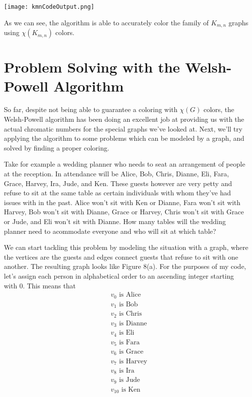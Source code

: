 \documentclass[12pt, letterpaper]{article}
\begin{document}
\begin{center}
\texttt{[image: kmnCodeOutput.png]}
\end{center}


As we can see, the algorithm is able to accurately color the family of $K_{m,n}$ graphs using $\chi(K_{m,n})$ colors.


\section*{Problem Solving with the Welsh-Powell Algorithm}


So far, despite not being able to guarantee a coloring with $\chi(G)$ colors, the Welsh-Powell algorithm has been doing an excellent job at providing us with the actual chromatic numbers for the special graphs we've looked at. Next, we'll try applying the algorithm to some problems which can be modeled by a graph, and solved by finding a proper coloring.


Take for example a wedding planner who needs to seat an arrangement of people at the reception. In attendance will be Alice, Bob, Chris, Dianne, Eli, Fara, Grace, Harvey, Ira, Jude, and Ken. These guests however are very petty and refuse to sit at the same table as certain individuals with whom they've had issues with in the past. Alice won't sit with Ken or Dianne, Fara won't sit with Harvey, Bob won't sit with Dianne, Grace or Harvey, Chris won't sit with Grace or Jude, and Eli won't sit with Dianne. How many tables will the wedding planner need to acommodate everyone and who will sit at which table? 


We can start tackling this problem by modeling the situation with a graph, where the vertices are the guests and edges connect guests that refuse to sit with one another. The resulting graph looks like Figure 8(a). For the purposes of my code, let's assign each person in alphabetical order to an ascending integer starting with 0. This means that
\begin{align*}
&v_0 \text{ is Alice}\\
&v_1 \text{ is Bob}\\
&v_2 \text{ is Chris}\\
&v_3 \text{ is Dianne}\\
&v_4 \text{ is Eli}\\
&v_5 \text{ is Fara}\\
&v_6 \text{ is Grace}\\
&v_7 \text{ is Harvey}\\
&v_8 \text{ is Ira}\\
&v_9 \text{ is Jude}\\
&v_{10} \text{ is Ken}
\end{align*}
\end{document}
